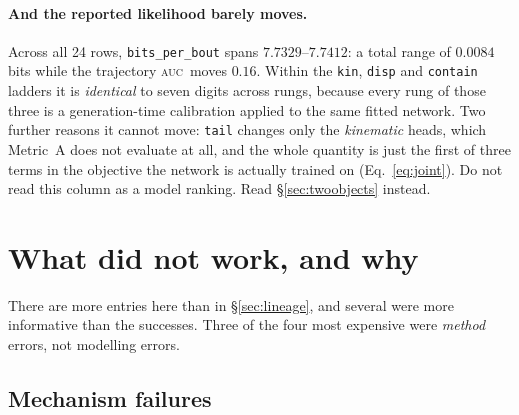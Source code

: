 \documentclass[11pt,a4paper]{article}
\newcommand{\auc}{\textsc{auc}}
\newcommand{\code}[1]{\texttt{\small #1}}
\begin{document}
\paragraph{And the reported likelihood barely moves.}
Across all 24 rows, \code{bits\_per\_bout} spans $7.7329$--$7.7412$: a total range of
$\mathbf{0.0084}$ bits while the trajectory \auc\ moves $0.16$. Within the \code{kin},
\code{disp} and \code{contain} ladders it is \emph{identical} to seven digits across
rungs, because every rung of those three is a generation-time calibration applied to the
same fitted network. Two further reasons it cannot move: \code{tail} changes only the
\emph{kinematic} heads, which Metric~A does not evaluate at all, and the whole quantity is
just the first of three terms in the objective the network is actually trained on
(Eq.~\eqref{eq:joint}). Do not read this column as a model ranking. Read
\S\ref{sec:twoobjects} instead.

\section{What did not work, and why}\label{sec:negatives}

There are more entries here than in \S\ref{sec:lineage}, and several were more
informative than the successes. Three of the four most expensive were \emph{method}
errors, not modelling errors.

\subsection{Mechanism failures}
\end{document}
